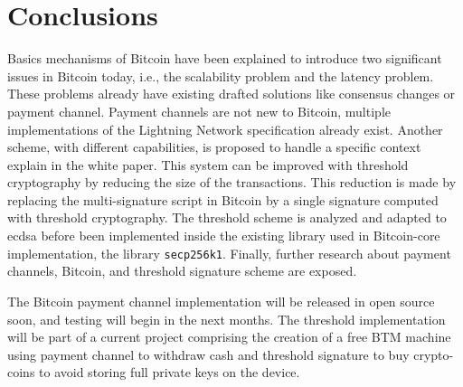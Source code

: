 \chapter{Conclusions}
\label{chap:conclusions}

Basics mechanisms of Bitcoin have been explained to introduce two significant
issues in Bitcoin today, i.e., the scalability problem and the latency problem.
These problems already have existing drafted solutions like consensus changes or
payment channel. Payment channels are not new to Bitcoin, multiple
implementations of the Lightning Network specification already exist. Another
scheme, with different capabilities, is proposed to handle a specific context
explain in the white paper. This system can be improved with threshold
cryptography by reducing the size of the transactions. This reduction is made by
replacing the multi-signature script in Bitcoin by a single signature computed
with threshold cryptography. The threshold scheme is analyzed and adapted to
\gls{ecdsa} before been implemented inside the existing library used in
Bitcoin-core implementation, the library \texttt{secp256k1}. Finally, further
research about payment channels, Bitcoin, and threshold signature scheme are
exposed.

The Bitcoin payment channel implementation will be released in open source soon,
and testing will begin in the next months. The threshold implementation will be
part of a current project comprising the creation of a free BTM machine using
payment channel to withdraw cash and threshold signature to buy crypto-coins to
avoid storing full private keys on the device.
